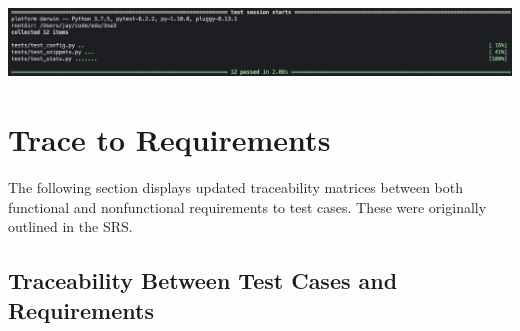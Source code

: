 \documentclass[12pt, titlepage]{article}
\begin{document}
\includegraphics[width=\textwidth]{testResults.png}



\newpage
\section{Trace to Requirements}

The following section displays updated traceability matrices between both functional and nonfunctional requirements to test cases. These were originally outlined in the SRS.

\subsection{Traceability Between Test Cases and Requirements}
\end{document}
